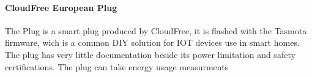\paragraph{CloudFree European Plug}
The Plug is a smart plug produced by CloudFree, it is flashed with the Tasmota firmware, wich is a common DIY solution for IOT devices use in smart homes. The plug has very little documentation beside its power limitation and safety certifications. The plug can take energy usage measurments